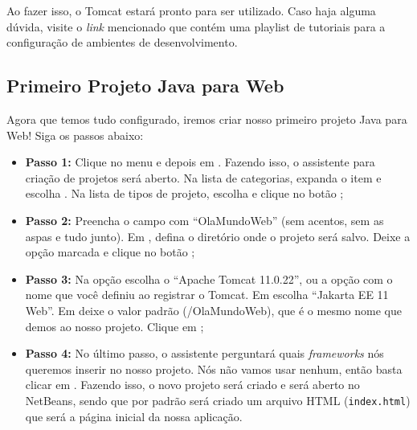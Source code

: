 Ao fazer isso, o Tomcat estará pronto para ser utilizado. Caso haja alguma dúvida, visite o \textit{link} mencionado que contém uma playlist de tutoriais para a configuração de ambientes de desenvolvimento.


\subsection{Primeiro Projeto Java para Web}\label{subsec:primeiroProjeto}

Agora que temos tudo configurado, iremos criar nosso primeiro projeto Java para Web! Siga os passos abaixo:

\begin{itemize}

    \item \textbf{Passo 1:} Clique no menu  e depois em  . Fazendo isso, o assistente para criação de projetos será aberto. Na lista de categorias, expanda o item   e escolha  . Na lista de tipos de projeto, escolha   e clique no botão  ;
    
    \item \textbf{Passo 2:} Preencha o campo  com ``OlaMundoWeb'' (sem acentos, sem as aspas e tudo junto). Em , defina o diretório onde o projeto será salvo. Deixe a opção  marcada e clique no botão ;
    
    \item \textbf{Passo 3:} Na opção  escolha o ``Apache Tomcat 11.0.22'', ou a opção com o nome que você definiu ao registrar o Tomcat. Em  escolha ``Jakarta EE 11 Web''. Em  deixe o valor padrão (/OlaMundoWeb), que é o mesmo nome que demos ao nosso projeto. Clique em ;
    
    \item \textbf{Passo 4:} No último passo, o assistente perguntará quais \textit{frameworks} nós queremos inserir no nosso projeto. Nós não vamos usar nenhum, então basta clicar em . Fazendo isso, o novo projeto será criado e será aberto no NetBeans, sendo que por padrão será criado um arquivo HTML (\texttt{index.html}) que será a página inicial da nossa aplicação.
    
\end{itemize}

